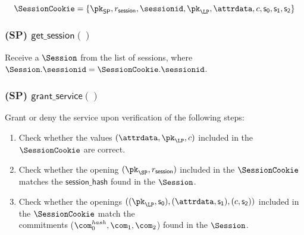 $$\SessionCookie = \{\pk_{\mathsf{SP}}, r_\mathsf{session}, \sessionid, \pk_{\LP}, \attrdata, c, \mathsf{s_0}, \mathsf{s_1}, \mathsf{s_2}\}$$


\subsubsection{(\textbf{SP}) $\mathsf{get\_session()}$}

Receive a $\Session$ from the list of sessions, where $\Session.\sessionid = \SessionCookie.\sessionid$.


\subsubsection{(\textbf{SP}) $\mathsf{grant\_service()}$}

Grant or deny the service upon verification of the following steps:

\begin{enumerate}
	\item Check whether the values $(\attrdata, \pk_{\LP}, c)$ included in the $\SessionCookie$ are correct.
	\item Check whether the opening $(\pk_{\SP}, r_\mathsf{session})$ included in the $\SessionCookie$ matches the $\mathsf{session\_hash}$ found in the $\Session$.
	\item Check whether the openings $((\pk_{\LP}, \mathsf{s_0}), (\attrdata, \mathsf{s_1}), (c, \mathsf{s_2}))$ included in the $\SessionCookie$ match the\\
	commitments ($\com_0^{hash}, \com_1, \com_2$) found in the $\Session$.
\end{enumerate}



